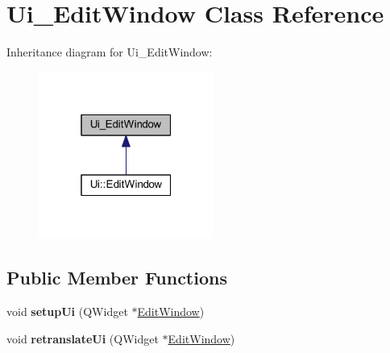 \hypertarget{class_ui___edit_window}{}\section{Ui\+\_\+\+Edit\+Window Class Reference}
\label{class_ui___edit_window}


Inheritance diagram for Ui\+\_\+\+Edit\+Window\+:
\nopagebreak
\begin{figure}[H]
\begin{center}
\leavevmode
\includegraphics[width=163pt]{class_ui___edit_window__inherit__graph}
\end{center}
\end{figure}
\subsection*{Public Member Functions}
\begin{DoxyCompactItemize}
\item 
\mbox{\label{class_ui___edit_window_a73e4228c854ad2e662f738054844fdc3}} 
void {\bfseries setup\+Ui} (Q\+Widget $\ast$\mbox{\hyperlink{class_edit_window}{Edit\+Window}})
\item 
\mbox{\label{class_ui___edit_window_a49415a0f0f9abdd22402b5adb5970a0f}} 
void {\bfseries retranslate\+Ui} (Q\+Widget $\ast$\mbox{\hyperlink{class_edit_window}{Edit\+Window}})
\end{DoxyCompactItemize}
